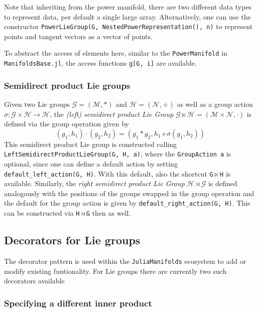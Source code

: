 \documentclass{juliacon}
\newcommand{\term}[1]{\emph{#1}}
\begin{document}
Note that inheriting from the power manifold, there are two different data types to represent data, per default a single large array. Alternatively, one can use the constructor \verb|PowerLieGroup(G, NestedPowerRepresentation(), n)| to represent points and tangent vectors as a vector of points.

To abstract the access of elements here, similar to the \verb|PowerManifold| in \verb|ManifoldsBase.jl|, the access functions \verb|g[G, i]| are available.

\subsubsection*{Semidirect product Lie groups}

Given two Lie groups \(\mathcal{G} = (\mathcal M, \ast)\) and \(\mathcal{H} = (\mathcal N, \diamond)\) as well as a group action \(\sigma\colon \mathcal{G} \times \mathcal{H} \to \mathcal{H}\),
the \term{(left) semidirect product Lie Group} $\mathcal{G} \ltimes \mathcal{H} = (\mathcal{M} \times \mathcal{N}, \cdot)$ is defined via the group operation given by
\begin{equation*}
    (g_1, h_1) \cdot (g_2, h_2) = (g_1 \ast g_2, h_1 \diamond \sigma(g_1, h_2))
\end{equation*}
This semidirect product Lie group is constructed calling \verb|LeftSemidirectProductLieGroup(G, H, a)|, where the \verb|GroupAction a| is optional, since one can define a default action by setting \verb|default_left_action(G, H)|.
With this default, also the shortcut \verb|G|\,$\ltimes$\,\verb|H| is available.
%
Similarly, the \term{right semidirect product Lie Group} $\mathcal{H} \rtimes \mathcal{G}$ is defined analogously with the positions of the groups swapped in the group operation and the default for the group action is given by \verb|default_right_action(G, H)|. This can be constructed via \verb|H|\,$\rtimes$\,\verb|G| then as well.

\subsection{Decorators for Lie groups}

The decorator pattern is used within the \verb|JuliaManifolds| ecosystem to add or modify existing funtionality.
For Lie groups there are currently two such decorators available

\subsubsection*{Specifying a different inner product}
\end{document}
